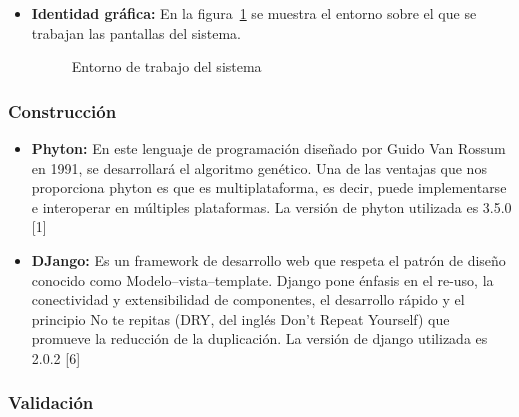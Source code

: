 \begin{itemize}
		\item \textbf{Identidad gráfica:} En la figura~\ref{fig:entornoTrabajo} se muestra el entorno sobre el que se trabajan las pantallas del sistema.
		
		\begin{figure}[htbp!]
			\begin{center}
				\caption{Entorno de trabajo del sistema}
				\label{fig:entornoTrabajo}
			\end{center}
		\end{figure}
		
		
		
	\end{itemize}
	
	\subsubsection{Construcción}
	
	\begin{itemize}
		\item \textbf{Phyton:} En este lenguaje de programación diseñado por Guido Van Rossum en 1991, se desarrollará el algoritmo genético. Una de las ventajas que nos proporciona phyton es que es multiplataforma, es decir, puede implementarse e interoperar en múltiples plataformas. La versión de phyton utilizada es 3.5.0 [1] 
		
		\item \textbf{DJango:} Es un framework de desarrollo web que respeta el patrón de diseño conocido como Modelo–vista–template. Django pone énfasis en el re-uso, la conectividad y extensibilidad de componentes, el desarrollo rápido y el principio No te repitas (DRY, del inglés Don't Repeat Yourself) que promueve la reducción de la duplicación. La versión de django utilizada es 2.0.2 [6]
		
	\end{itemize}
	
		
	\subsubsection{Validación}
	
